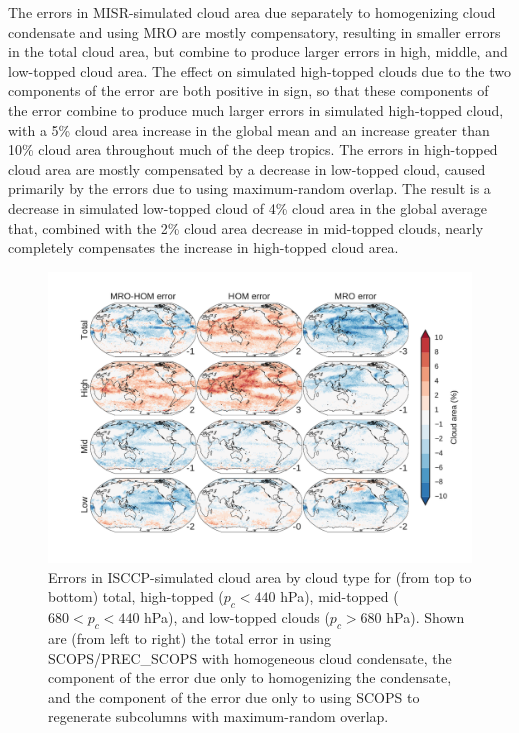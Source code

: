 The errors in MISR-simulated cloud area due separately to homogenizing cloud condensate and using MRO are mostly compensatory, resulting in smaller errors in the total cloud area, but combine to produce larger errors in high, middle, and low-topped cloud area. The effect on simulated high-topped clouds due to the two components of the error are both positive in sign, so that these components of the error combine to produce much larger errors in simulated high-topped cloud, with a 5\% cloud area increase in the global mean and an increase greater than 10\% cloud area throughout much of the deep tropics. The errors in high-topped cloud area are mostly compensated by a decrease in low-topped cloud, caused primarily by the errors due to using maximum-random overlap. The result is a decrease in simulated low-topped cloud of 4\% cloud area in the global average that, combined with the 2\% cloud area decrease in mid-topped clouds, nearly completely compensates the increase in high-topped cloud area. 

\begin{figure}
\centering
\includegraphics[width=\columnwidth]{graphics/subgrid1_cldisccp_maps_diff.pdf}
\caption{Errors in ISCCP-simulated cloud area by cloud type for (from top to bottom) total, high-topped ($p_c < 440$ hPa), mid-topped ($680 < p_c < 440$ hPa), and low-topped clouds ($p_c > 680$ hPa). Shown are (from left to right) the total error in using SCOPS/PREC\_SCOPS with homogeneous cloud condensate, the component of the error due only to homogenizing the condensate, and the component of the error due only to using SCOPS to regenerate subcolumns with maximum-random overlap.}
\label{sg_cldisccp_errors}
\end{figure}

